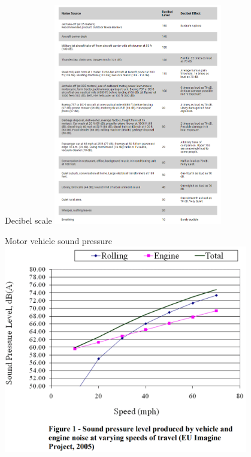 \documentclass{beamer}
\begin{document}
    \begin{frame}{Decibel scale}
        \includegraphics[width = 0.55\textwidth]{Decibel levels.PNG}
    \end{frame}

    \begin{frame}{Motor vehicle sound pressure}
        \includegraphics[width = 0.8\textwidth]{Vehicle sound pressure.PNG}
    \end{frame}
\end{document}

